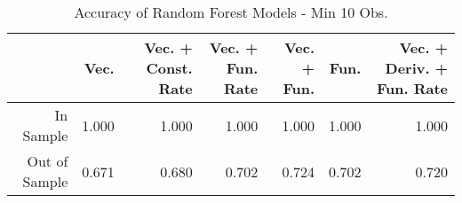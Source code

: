 \begin{table}[ht]
\centering
\begin{tabular}{rrrrrrr}
  \hline
 & Vec. & Vec. + Const. Rate & Vec. + Fun. Rate & Vec. + Fun. & Fun. & Vec. + Deriv. + Fun. Rate \\ 
  \hline
In Sample & 1.000 & 1.000 & 1.000 & 1.000 & 1.000 & 1.000 \\ 
  Out of Sample & 0.671 & 0.680 & 0.702 & 0.724 & 0.702 & 0.720 \\ 
   \hline
\end{tabular}
\caption{Accuracy of Random Forest Models - Min 10 Obs.} 
\label{rf_10obs_acc}
\end{table}
